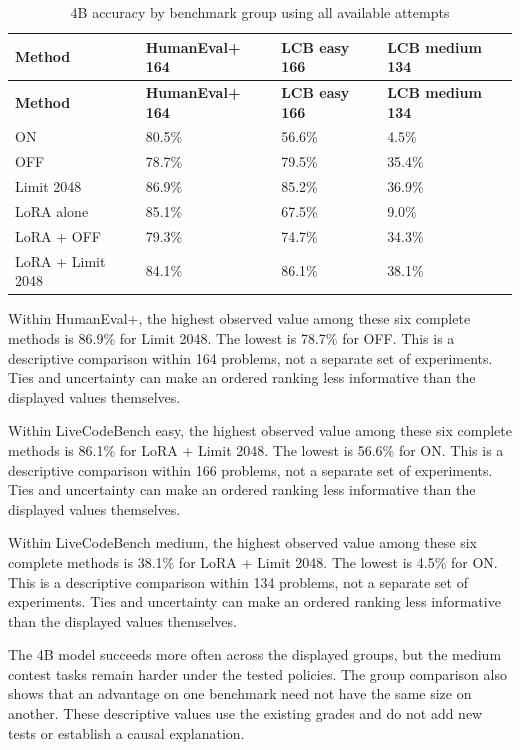\documentclass[11pt,letterpaper]{article}
\begin{document}
\begingroup\singlespacing\small\setlength{\tabcolsep}{4pt}
\begin{longtable}{|p{1.455in}|p{1.455in}|p{1.455in}|p{1.455in}|}
\caption{4B accuracy by benchmark group using all available attempts}\label{tab:groupsX4b}\\
\hline
\textbf{Method} & \textbf{HumanEval+ 164} & \textbf{LCB easy 166} & \textbf{LCB medium 134}\\\hline
\endfirsthead
\hline
\textbf{Method} & \textbf{HumanEval+ 164} & \textbf{LCB easy 166} & \textbf{LCB medium 134}\\\hline
\endhead
ON & 80.5\% & 56.6\% & 4.5\%\\\hline
OFF & 78.7\% & 79.5\% & 35.4\%\\\hline
Limit 2048 & 86.9\% & 85.2\% & 36.9\%\\\hline
LoRA alone & 85.1\% & 67.5\% & 9.0\%\\\hline
LoRA + OFF & 79.3\% & 74.7\% & 34.3\%\\\hline
LoRA + Limit  2048 & 84.1\% & 86.1\% & 38.1\%\\\hline
\end{longtable}
\endgroup

Within HumanEval+, the highest observed value among these six complete methods is 86.9\% for Limit 2048. The lowest is 78.7\% for OFF. This is a descriptive comparison within 164 problems, not a separate set of experiments. Ties and uncertainty can make an ordered ranking less informative than the displayed values themselves.\par

Within LiveCodeBench easy, the highest observed value among these six complete methods is 86.1\% for LoRA + Limit  2048. The lowest is 56.6\% for ON. This is a descriptive comparison within 166 problems, not a separate set of experiments. Ties and uncertainty can make an ordered ranking less informative than the displayed values themselves.\par

Within LiveCodeBench medium, the highest observed value among these six complete methods is 38.1\% for LoRA + Limit  2048. The lowest is 4.5\% for ON. This is a descriptive comparison within 134 problems, not a separate set of experiments. Ties and uncertainty can make an ordered ranking less informative than the displayed values themselves.\par

The 4B model succeeds more often across the displayed groups, but the medium contest tasks remain harder under the tested policies. The group comparison also shows that an advantage on one benchmark need not have the same size on another. These descriptive values use the existing grades and do not add new tests or establish a causal explanation.\par
\end{document}
